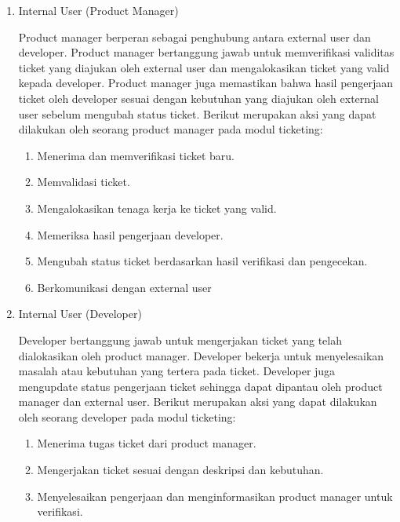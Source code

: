 \documentclass[12pt]{article}
\begin{document}
\begin{enumerate}[label=\textbf{4.\arabic*.}]
\begin{enumerate}[label=\textbf{4.1.\arabic*.}, wide, labelwidth=!, labelindent=0pt]
\begin{enumerate}[label=\arabic*.]
            \item Internal User (Product Manager)
            
            Product manager berperan sebagai penghubung antara external user dan developer. Product manager bertanggung jawab untuk memverifikasi validitas ticket yang diajukan oleh external user dan mengalokasikan ticket yang valid kepada developer. Product manager juga memastikan bahwa hasil pengerjaan ticket oleh developer sesuai dengan kebutuhan yang diajukan oleh external user sebelum mengubah status ticket. Berikut merupakan aksi yang dapat dilakukan oleh seorang product manager pada modul ticketing:

            \begin{enumerate}
                \item Menerima dan memverifikasi ticket baru.
                \item Memvalidasi ticket.
                \item Mengalokasikan tenaga kerja ke ticket yang valid.
                \item Memeriksa hasil pengerjaan developer.
                \item Mengubah status ticket berdasarkan hasil verifikasi dan pengecekan.
                \item Berkomunikasi dengan external user
            \end{enumerate}

            \item Internal User (Developer)
            
            Developer bertanggung jawab untuk mengerjakan ticket yang telah dialokasikan oleh product manager. Developer bekerja untuk menyelesaikan masalah atau kebutuhan yang tertera pada ticket. Developer juga mengupdate status pengerjaan ticket sehingga dapat dipantau oleh product manager dan external user. Berikut merupakan aksi yang dapat dilakukan oleh seorang developer pada modul ticketing:

            \begin{enumerate}
                \item Menerima tugas ticket dari product manager.
                \item Mengerjakan ticket sesuai dengan deskripsi dan kebutuhan.
                \item Menyelesaikan pengerjaan dan menginformasikan product manager untuk verifikasi.
            \end{enumerate}


\end{enumerate}
\end{enumerate}
\end{enumerate}
\end{document}
